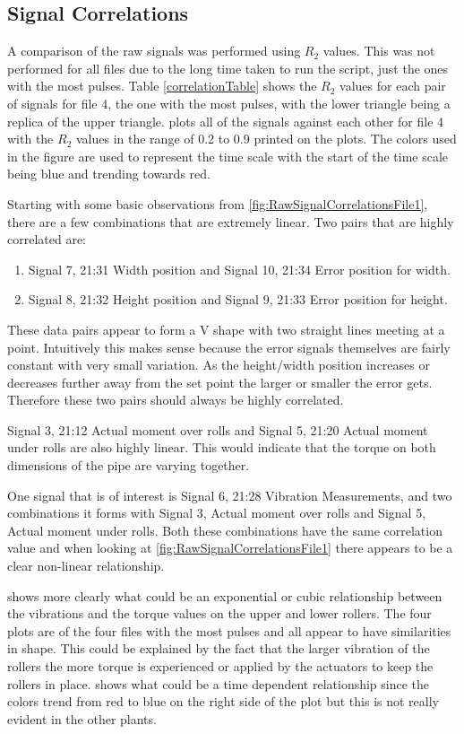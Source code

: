 \documentclass[]{article}
\begin{document}
\subsection{Signal Correlations}
A comparison of the raw signals was performed using $R_2$ values. This was not performed for all files due to the long time taken to run the script, just the ones with the most pulses. Table \ref{correlationTable} shows the $R_2$ values for each pair of signals for file 4, the one with the most pulses, with the lower triangle being a replica of the upper triangle.  plots all of the signals against each other for file 4 with the $R_2$ values in the range of 0.2 to 0.9 printed on the plots. The colors used in the figure are used to represent the time scale with the start of the time scale being blue and trending towards red.

Starting with some basic observations from \cref{fig:RawSignalCorrelationsFile1}, there are a few combinations that are extremely linear. Two pairs that are highly correlated are:
\begin{enumerate}
\item Signal 7, 21:31 Width position and Signal 10, 21:34 Error position for width.
\item Signal 8, 21:32 Height position and Signal 9, 21:33 Error position for height.
\end{enumerate}
These data pairs appear to form a V shape with two straight lines meeting at a point. Intuitively this makes sense because the error signals themselves are fairly constant with very small variation. As the height/width position increases or decreases further away from the set point the larger or smaller the error gets. Therefore these two pairs should always be highly correlated.  

Signal 3, 21:12 Actual moment over rolls and Signal 5, 21:20 Actual moment under rolls are also highly linear. This would indicate that the torque on both dimensions of the pipe are varying together.

One signal that is of interest is Signal 6, 21:28 Vibration Measurements, and two combinations it forms with Signal 3, Actual moment over rolls and Signal 5, Actual moment under rolls. Both these combinations have the same correlation value and when looking at \cref{fig:RawSignalCorrelationsFile1} there appears to be a clear non-linear relationship.

 shows more clearly what could be an exponential or cubic relationship between the vibrations and the torque values on the upper and lower rollers. The four plots are of the four files with the most pulses and all appear to have similarities in shape. This could be explained by the fact that the larger vibration of the rollers the more torque is experienced or applied by the actuators to keep the rollers in place.  shows what could be a time dependent relationship since the colors trend from red to blue on the right side of the plot but this is not really evident in the other plants. 
\end{document}

